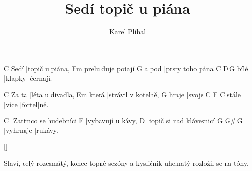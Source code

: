 \documentclass{song}
\title{Sedí topič u piána}
\author{Karel Plíhal}
\begin{document}
     C
Sedí |topič u piána,
     Em
prelu|duje potají
      G
a pod |prsty toho pána
     C       D\7\,G
bílé |klapky |černají.
\endstrophe

\strophe
      C
Za ta |léta u divadla,
      Em
která |strávil v kotelně,
      G
hraje |svoje 
      C     F      C
stále |více |fortel|ně.
\endstrophe

\strophe
C\7
|Zatímco se hudebníci
F
|vybavují u kávy,
D\7
|topič si nad klávesnicí
G         G\#\,G
|vyhrnuje |rukávy.
\endstrophe

\ref{}

\strophe*
Slaví, celý rozesmátý,
konec topné sezóny
a kysličník uhelnatý
rozložil se na tóny.
\endstrophe
\end{document}
